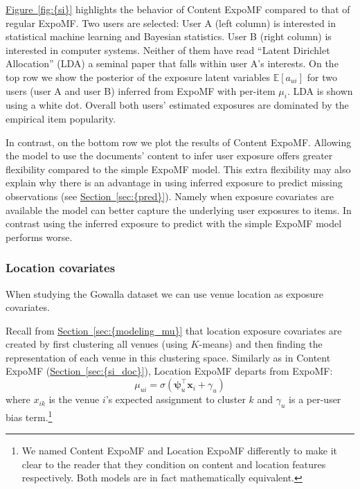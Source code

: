 \documentclass{sig-alternate-arxiv}
\begin{document}
{\hyperref[fig:{si}]{Figure~\ref*{fig:{si}}}} highlights the behavior of Content ExpoMF compared to that
of regular ExpoMF. Two users are selected: User A (left column) is
interested in statistical machine learning and Bayesian statistics. User B
(right column) is interested in computer systems. Neither of them have
read ``Latent Dirichlet Allocation'' (LDA) a seminal paper that falls within user A's
interests. On the top row we show the posterior of the exposure
latent variables $\mathbb{E}[a_{ui}]$ for two users (user A and user B)
inferred from ExpoMF with per-item $\mu_i$. LDA is shown using a white dot.
Overall both users' estimated exposures are dominated by the empirical item
popularity. 

In contrast, on the bottom row we plot the results of Content ExpoMF.
Allowing the model to use the documents' content to infer user exposure
offers greater flexibility compared to the simple ExpoMF model. 
This extra flexibility may also explain why there is an advantage in using
inferred exposure to predict missing observations (see {\hyperref[sec:{pred}]{Section~\ref*{sec:{pred}}}}).
Namely when exposure covariates are available the model can better capture the
underlying user exposures to items. In contrast using the inferred exposure to
predict with the simple ExpoMF model performs worse.

\subsubsection{Location covariates}
\label{sec:si_location}

When studying the Gowalla dataset we can use venue location as exposure covariates.

Recall from {\hyperref[sec:{modeling_mu}]{Section~\ref*{sec:{modeling_mu}}}} that location exposure covariates are created
by first clustering all venues (using $K$-means) and then finding the
representation of each venue in this clustering space. Similarly as in Content
ExpoMF ({\hyperref[sec:{si_doc}]{Section~\ref*{sec:{si_doc}}}}), Location ExpoMF departs from ExpoMF:
\begin{displaymath} \mu_{ui}= \sigma(\boldsymbol\psi_u^\top \mathbf{x}_i + \gamma_u)\end{displaymath}
where $x_{ik}$ is the venue $i$'s expected assignment to cluster $k$ and
$\gamma_u$ is a per-user bias term.\footnote{We named Content ExpoMF
and Location ExpoMF differently to make it clear to the reader that they
condition on content and location features respectively. Both models are
in fact mathematically equivalent.}
\end{document}
